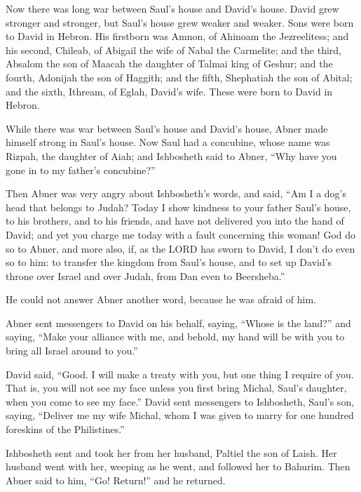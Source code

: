  Now there was long war between Saul's house and David's
house. David grew stronger and stronger, but Saul's house grew weaker
and weaker.  Sons were born to David in Hebron. His
firstborn was Amnon, of Ahinoam the Jezreelitess;  and his
second, Chileab, of Abigail the wife of Nabal the Carmelite; and the
third, Absalom the son of Maacah the daughter of Talmai king of Geshur;
 and the fourth, Adonijah the son of Haggith; and the fifth,
Shephatiah the son of Abital;  and the sixth, Ithream, of
Eglah, David's wife. These were born to David in Hebron.

 While there was war between Saul's house and David's house,
Abner made himself strong in Saul's house.  Now Saul had a
concubine, whose name was Rizpah, the daughter of Aiah; and Ishbosheth
said to Abner, ``Why have you gone in to my father's concubine?''

 Then Abner was very angry about Ishbosheth's words, and
said, ``Am I a dog's head that belongs to Judah? Today I show kindness
to your father Saul's house, to his brothers, and to his friends, and
have not delivered you into the hand of David; and yet you charge me
today with a fault concerning this woman!  God do so to
Abner, and more also, if, as the LORD has sworn to David, I don't do
even so to him:  to transfer the kingdom from Saul's house,
and to set up David's throne over Israel and over Judah, from Dan even
to Beersheba.''

 He could not answer Abner another word, because he was
afraid of him.

 Abner sent messengers to David on his behalf, saying,
``Whose is the land?'' and saying, ``Make your alliance with me, and
behold, my hand will be with you to bring all Israel around to you.''

 David said, ``Good. I will make a treaty with you, but one
thing I require of you. That is, you will not see my face unless you
first bring Michal, Saul's daughter, when you come to see my face.''
 David sent messengers to Ishbosheth, Saul's son, saying,
``Deliver me my wife Michal, whom I was given to marry for one hundred
foreskins of the Philistines.''

 Ishbosheth sent and took her from her husband, Paltiel the
son of Laish.  Her husband went with her, weeping as he
went, and followed her to Bahurim. Then Abner said to him, ``Go!
Return!'' and he returned.

